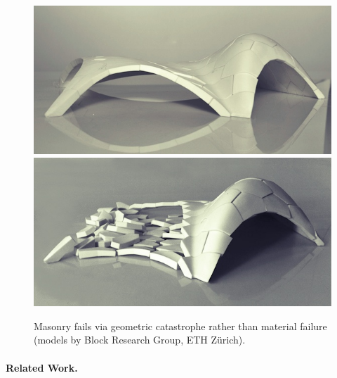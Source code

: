 \documentclass[review]{acmsiggraph}
\begin{document}
	\begin{figure}[t]
\includegraphics[height=.245\columnwidth]{fotos/block1.jpg}\hfill
\includegraphics[height=.245\columnwidth]{fotos/block2.jpg}
	\caption{Masonry fails via geometric
catastrophe rather than material failure (models by 
Block Research Group, ETH Z\"urich).}
	\label{fig:block}
	\end{figure}


\paragraph{Related Work.}
\end{document}
